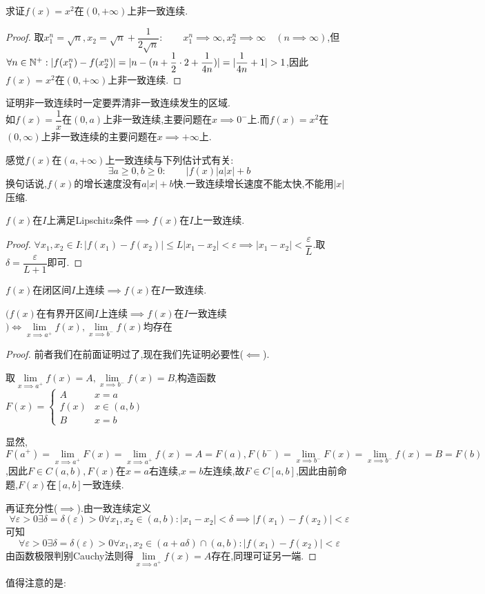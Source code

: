\documentclass[UTF8]{book}
\begin{document}
    \begin{example}
        求证$f(x)=x^2$在$(0,+\infty)$上非一致连续.
    \end{example}\begin{proof}
        取$x_1^n=\sqrt{n},x_2=\sqrt{n}+\dfrac{1}{2\sqrt{n}}:\qquad x_1^n\implies\infty,x_2^n\implies \infty\quad (n\implies \infty)$,但$\forall n\in\N^+:|f(x_1^n)-f(x_2^n)|=|n-(n+\dfrac{1}{2}\cdot 2+\dfrac{1}{4n})|=|\dfrac{1}{4n}+1|>1$,因此$f(x)=x^2$在$(0,+\infty)$上非一致连续.
    \end{proof}
    \begin{remark}
        证明非一致连续时一定要弄清非一致连续发生的区域.\\ 
        如$f(x)=\dfrac{1}{x}$在$(0,a)$上非一致连续,主要问题在$x\implies 0^-$上.而$f(x)=x^2$在$(0,\infty)$上非一致连续的主要问题在$x\implies +\infty$上.
    \end{remark}
    \begin{remark}
        感觉$f(x)$在$(a,+\infty)$上一致连续与下列估计式有关:\[\exists a\geq 0,b\geq 0:\qquad |f(x)|\nonumber a|x|+b\]
        换句话说,$f(x)$的增长速度没有$a|x|+b$快.一致连续增长速度不能太快,不能用$|x|$压缩.
    \end{remark}
    \begin{example}
        $f(x)$在$I$上满足Lipschitz条件$\implies f(x)$在$I$上一致连续.
    \end{example}\begin{proof}
        $\forall x_1,x_2\in I:|f(x_1)-f(x_2)|\leq L|x_1-x_2|<\varepsilon\implies |x_1-x_2|<\dfrac{\varepsilon}{L}$.取$\delta=\dfrac{\varepsilon}{L+1}$即可.
    \end{proof}
    \begin{theorem}[Cantor定理]
        $f(x)$在闭区间$I$上连续$\implies f(x)$在$I$一致连续.

        $\biggl( f(x)$在有界开区间$I$上连续$\implies f(x)$在$I$一致连续$\biggr)\iff \lim\limits_{x\implies a^+}f(x),\lim\limits_{x\implies b^-}f(x)$均存在
    \end{theorem}\begin{proof}
        前者我们在前面证明过了,现在我们先证明必要性($\impliedby$).

        取$\lim\limits_{x\implies a^+}f(x)=A,\lim\limits_{x\implies b^-}f(x)=B$,构造函数$F(x)=\begin{cases}A&x=a\\ f(x)&x\in (a,b)\\ B&x=b\end{cases}$

        显然,$F(a^+)=\lim\limits_{x\implies a^+}F(x)=\lim\limits_{x\implies a^+}f(x)=A=F(a),F(b^-)=\lim\limits_{x\implies b^-}F(x)=\lim\limits_{x\implies b^-}f(x)=B=F(b)$,因此$F\in C(a,b),F(x)$在$x=a$右连续,$x=b$左连续,故$F\in C[a,b]$,因此由前命题,$F(x)$在$[a,b]$一致连续.

        再证充分性($\implies$).由一致连续定义\[\forall \varepsilon>0\exists \delta=\delta(\varepsilon)>0\forall x_1,x_2\in(a,b):|x_1-x_2|<\delta \implies |f(x_1)-f(x_2)|<\varepsilon\]
        可知\[\forall \varepsilon>0\exists \delta=\delta(\varepsilon)>0\forall x_1,x_2\in(a+a\delta)\cap (a,b):|f(x_1)-f(x_2)|<\varepsilon\]
        由函数极限判别Cauchy法则得$\lim\limits_{x\implies a^+}f(x)=A$存在,同理可证另一端.
    \end{proof}值得注意的是:
\end{document}
